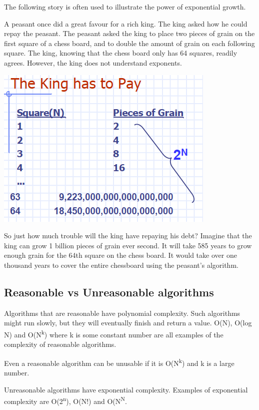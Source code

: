 The following story is often used to illustrate the power of exponential growth.

A peasant once did a great favour for a rich king.  The king asked how he could repay the peasant.   The peasant asked the king to place two pieces of grain on the first square of a chess board, and to double the amount of grain on each following square. The king, knowing that the chess board only has 64 squares, readily agrees.   However, the king does not understand exponents.


\includegraphics{pictures/wisePeasant.png}

So just how much trouble will the king have repaying his debt?   Imagine that the king can grow 1 billion pieces of grain ever second.   It will take 585 years to grow enough grain for the 64th square on the chess board.   It would take over one thousand years to cover the entire chessboard using the peasant's algorithm.

\subsection{Reasonable vs Unreasonable algorithms}

Algorithms that are reasonable have polynomial complexity.   Such algorithms might run slowly, but they will eventually finish and return a value.
O(N), O(log N) and O(N\textsuperscript{k})  where k is some constant number are all examples of the complexity of reasonable algorithms.

Even a reasonable algorithm can be unusable if it is O(N\textsuperscript{k}) and k is a large number.

Unreasonable algorithms have exponential complexity.   Examples of exponential complexity are O(2\textsuperscript{n}), O(N!) and O(N\textsuperscript{N}.

